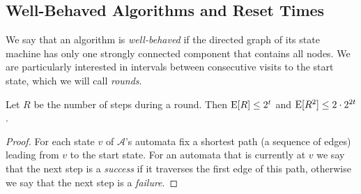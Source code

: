 \documentclass[acmtoalg]{acmtrans2m}
\begin{document}
\subsection{Well-Behaved Algorithms and Reset Times}

We say that an algorithm is \emph{well-behaved} if the directed graph
of its state machine has only one strongly connected component that
contains all nodes.  We are particularly interested in intervals
between consecutive visits to the start state, which we will call
\emph{rounds}.

\begin{lem}
Let $R$ be the number of steps during a round. Then 
$\mathrm{E}[R] \le 2^t$ and $\mathrm{E}[R^2] \le 2\cdot2^{2t}$.
\end{lem}

\begin{proof}
For each state $v$ of $\mathcal{A}$'s automata fix a shortest path (a
sequence of edges) leading from $v$ to the start state.  For an
automata that is currently at $v$ we say that the next step is a
\emph{success} if it traverses the first edge of this path, otherwise
we say that the next step is a \emph{failure}.


\end{proof}
\end{document}
